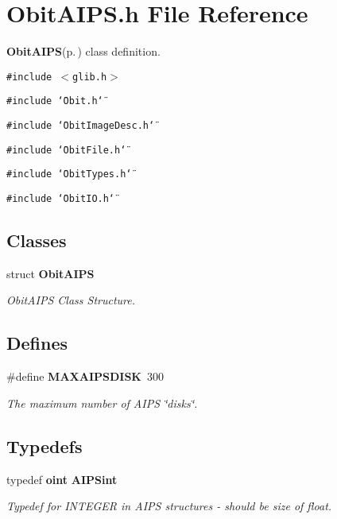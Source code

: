 \section{Obit\-AIPS.h File Reference}
\label{ObitAIPS_8h}
{\bf Obit\-AIPS}{\rm (p.\,\pageref{structObitAIPS})} class definition. 

{\tt \#include $<$glib.h$>$}\par
{\tt \#include \char`\"{}Obit.h\char`\"{}}\par
{\tt \#include \char`\"{}Obit\-Image\-Desc.h\char`\"{}}\par
{\tt \#include \char`\"{}Obit\-File.h\char`\"{}}\par
{\tt \#include \char`\"{}Obit\-Types.h\char`\"{}}\par
{\tt \#include \char`\"{}Obit\-IO.h\char`\"{}}\par
\subsection*{Classes}
\begin{CompactItemize}
\item 
struct {\bf Obit\-AIPS}
\begin{CompactList}\small\item\em Obit\-AIPS Class Structure. \item\end{CompactList}\end{CompactItemize}
\subsection*{Defines}
\begin{CompactItemize}
\item 
\#define {\bf MAXAIPSDISK}\ 300
\begin{CompactList}\small\item\em The maximum number of AIPS \char`\"{}disks\char`\"{}. \item\end{CompactList}\end{CompactItemize}
\subsection*{Typedefs}
\begin{CompactItemize}
\item 
typedef {\bf oint} {\bf AIPSint}
\begin{CompactList}\small\item\em Typedef for INTEGER in AIPS structures - should be size of float. \item\end{CompactList}\end{CompactItemize}
